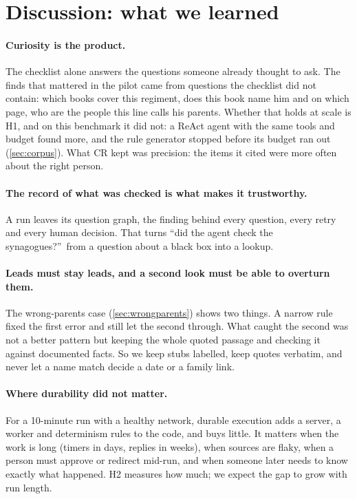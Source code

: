 \section{Discussion: what we learned}
\label{sec:discussion}

\paragraph{Curiosity is the product.} The checklist alone answers the questions someone already thought to ask. The finds that mattered in the pilot came from questions the checklist did not contain: which books cover this regiment, does this book name him and on which page, who are the people this line calls his parents. Whether that holds at scale is H1, and on this benchmark it did not: a ReAct agent with the same tools and budget found more, and the rule generator stopped before its budget ran out (\cref{sec:corpus}). What CR kept was precision: the items it cited were more often about the right person.

\paragraph{The record of what was checked is what makes it trustworthy.} A run leaves its question graph, the finding behind every question, every retry and every human decision. That turns ``did the agent check the synagogues?''\ from a question about a black box into a lookup.

\paragraph{Leads must stay leads, and a second look must be able to overturn them.} The wrong-parents case (\cref{sec:wrongparents}) shows two things. A narrow rule fixed the first error and still let the second through. What caught the second was not a better pattern but keeping the whole quoted passage and checking it against documented facts. So we keep stubs labelled, keep quotes verbatim, and never let a name match decide a date or a family link.

\paragraph{Where durability did not matter.} For a 10-minute run with a healthy network, durable execution adds a server, a worker and determinism rules to the code, and buys little. It matters when the work is long (timers in days, replies in weeks), when sources are flaky, when a person must approve or redirect mid-run, and when someone later needs to know exactly what happened. H2 measures how much; we expect the gap to grow with run length. 

